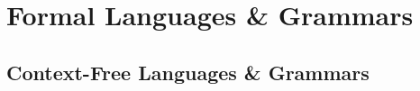 \section{Formal Languages \& Grammars}
\cite{DBLP:books/daglib/0090590}
\subsection{Context-Free Languages \& Grammars}